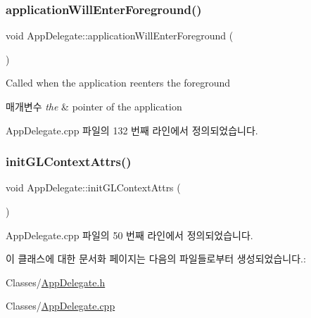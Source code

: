 \subsubsection{\texorpdfstring{application\+Will\+Enter\+Foreground()}{applicationWillEnterForeground()}}
{\footnotesize\ttfamily void App\+Delegate\+::application\+Will\+Enter\+Foreground (\begin{DoxyParamCaption}{ }\end{DoxyParamCaption})\hspace{0.3cm}{\ttfamily [virtual]}}



Called when the application reenters the foreground 


\begin{DoxyParams}{매개변수}
{\em the} & pointer of the application \\
\hline
\end{DoxyParams}


App\+Delegate.\+cpp 파일의 132 번째 라인에서 정의되었습니다.

\mbox{\label{class_app_delegate_a2de4e8ab7d04bde311684e1d4ceb2c0f}} 
\subsubsection{\texorpdfstring{init\+G\+L\+Context\+Attrs()}{initGLContextAttrs()}}
{\footnotesize\ttfamily void App\+Delegate\+::init\+G\+L\+Context\+Attrs (\begin{DoxyParamCaption}{ }\end{DoxyParamCaption})\hspace{0.3cm}{\ttfamily [virtual]}}



App\+Delegate.\+cpp 파일의 50 번째 라인에서 정의되었습니다.



이 클래스에 대한 문서화 페이지는 다음의 파일들로부터 생성되었습니다.\+:\begin{DoxyCompactItemize}
\item 
Classes/\hyperlink{_app_delegate_8h}{App\+Delegate.\+h}\item 
Classes/\hyperlink{_app_delegate_8cpp}{App\+Delegate.\+cpp}\end{DoxyCompactItemize}
